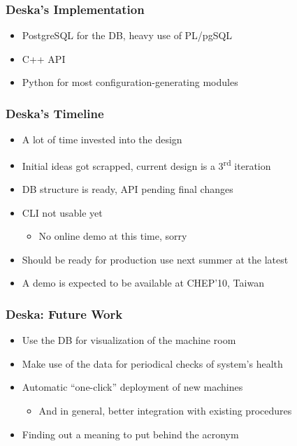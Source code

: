 \documentclass{beamer}
\begin{document}
\begin{frame}[fragile]
\frametitle{Deska's Implementation}
\begin{itemize}
    \item PostgreSQL for the DB, heavy use of PL/pgSQL
    \item C++ API
    \item Python for most configuration-generating modules
\end{itemize}
\end{frame}

\begin{frame}[fragile]
\frametitle{Deska's Timeline}
\begin{itemize}
    \item A lot of time invested into the design
    \item Initial ideas got scrapped, current design is a 3\textsuperscript{rd} iteration
    \item DB structure is ready, API pending final changes
    \item CLI not usable yet
        \begin{itemize}
            \item No online demo at this time, sorry
        \end{itemize}
    \item Should be ready for production use next summer at the latest
    \item A demo is expected to be available at CHEP'10, Taiwan
\end{itemize}
\end{frame}

\begin{frame}[fragile]
\frametitle{Deska: Future Work}
\begin{itemize}
    \item Use the DB for visualization of the machine room
    \item Make use of the data for periodical checks of system's health
    \item Automatic ``one-click'' deployment of new machines
        \begin{itemize}
            \item And in general, better integration with existing procedures
        \end{itemize}
    \item Finding out a meaning to put behind the acronym
\end{itemize}
\end{frame}
\end{document}

